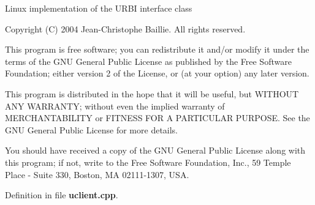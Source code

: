 Linux implementation of the URBI interface class

Copyright (C) 2004 Jean-Christophe Baillie. All rights reserved.

This program is free software; you can redistribute it and/or modify it under the terms of the GNU General Public License as published by the Free Software Foundation; either version 2 of the License, or (at your option) any later version.

This program is distributed in the hope that it will be useful, but WITHOUT ANY WARRANTY; without even the implied warranty of MERCHANTABILITY or FITNESS FOR A PARTICULAR PURPOSE. See the GNU General Public License for more details.

You should have received a copy of the GNU General Public License along with this program; if not, write to the Free Software Foundation, Inc., 59 Temple Place - Suite 330, Boston, MA 02111-1307, USA.

Definition in file {\bf uclient.cpp}.